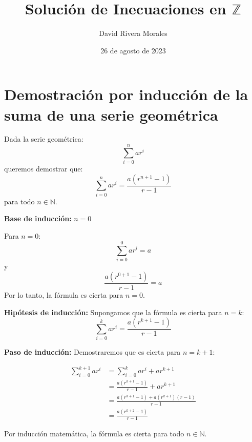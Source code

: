 \documentclass{article}
\begin{document}
\title{Solución de Inecuaciones en \( \mathbb{Z} \)}
\author{David Rivera Morales}
\date{26 de agosto de 2023}

\maketitle

\section*{Demostración por inducción de la suma de una serie geométrica}

Dada la serie geométrica:
\[
\sum_{i=0}^{n} ar^i
\]
queremos demostrar que:
\[
\sum_{i=0}^{n} ar^i = \frac{a(r^{n+1}-1)}{r-1}
\]
para todo \( n \in \mathbb{N} \).

\textbf{Base de inducción:} \( n = 0 \)

Para \( n = 0 \):
\[
\sum_{i=0}^{0} ar^i = a
\]
y
\[
\frac{a(r^{0+1}-1)}{r-1} = a
\]
Por lo tanto, la fórmula es cierta para \( n = 0 \).

\textbf{Hipótesis de inducción:} Supongamos que la fórmula es cierta para \( n = k \):
\[
\sum_{i=0}^{k} ar^i = \frac{a(r^{k+1}-1)}{r-1}
\]

\textbf{Paso de inducción:} Demostraremos que es cierta para \( n = k+1 \):


\begin{align*}
\sum_{i=0}^{k+1} ar^i &= \sum_{i=0}^{k} ar^i + ar^{k+1} \\
&= \frac{a(r^{k+1}-1)}{r-1} + ar^{k+1} \\
&= \frac{a(r^{k+1}-1) + a(r^{k+1})(r-1)}{r-1} \\
&= \frac{a(r^{k+2}-1)}{r-1}
\end{align*}

Por inducción matemática, la fórmula es cierta para todo \( n \in \mathbb{N} \).
\end{document}
